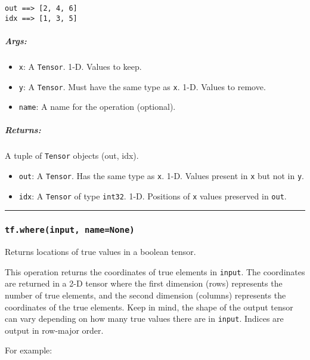 \begin{verbatim}
out ==> [2, 4, 6]
idx ==> [1, 3, 5]
\end{verbatim}

\subparagraph{Args: }\label{args-56}

\begin{itemize}
\tightlist
\item
  \texttt{x}: A \texttt{Tensor}. 1-D. Values to keep.
\item
  \texttt{y}: A \texttt{Tensor}. Must have the same type as \texttt{x}.
  1-D. Values to remove.
\item
  \texttt{name}: A name for the operation (optional).
\end{itemize}

\subparagraph{Returns: }\label{returns-56}

A tuple of \texttt{Tensor} objects (out, idx).

\begin{itemize}
\tightlist
\item
  \texttt{out}: A \texttt{Tensor}. Has the same type as \texttt{x}. 1-D.
  Values present in \texttt{x} but not in \texttt{y}.
\item
  \texttt{idx}: A \texttt{Tensor} of type \texttt{int32}. 1-D. Positions
  of \texttt{x} values preserved in \texttt{out}.
\end{itemize}

\begin{center}\rule{0.5\linewidth}{\linethickness}\end{center}

\subsubsection{\texorpdfstring{\texttt{tf.where(input,\ name=None)}
}{tf.where(input, name=None) }}\label{tf.whereinput-namenone}

Returns locations of true values in a boolean tensor.

This operation returns the coordinates of true elements in
\texttt{input}. The coordinates are returned in a 2-D tensor where the
first dimension (rows) represents the number of true elements, and the
second dimension (columns) represents the coordinates of the true
elements. Keep in mind, the shape of the output tensor can vary
depending on how many true values there are in \texttt{input}. Indices
are output in row-major order.

For example:

